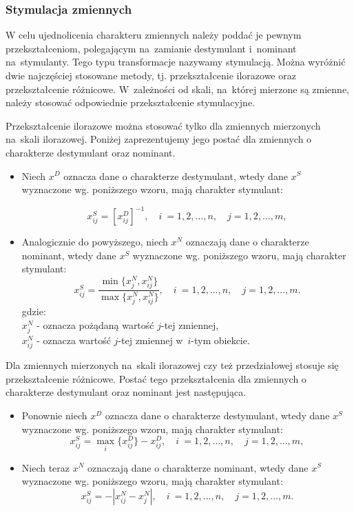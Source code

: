 \documentclass[12pt,a4paper]{report}
\begin{document}
\subsubsection{Stymulacja zmiennych}
W celu ujednolicenia charakteru zmiennych należy poddać je pewnym przekształceniom, polegającym na~zamianie destymulant i~nominant na~stymulanty. Tego typu transformacje nazywamy stymulacją. Można wyróżnić dwie najczęściej stosowane metody, tj. przekształcenie ilorazowe oraz przekształcenie różnicowe. W~zależności od skali, na~której mierzone są zmienne, należy stosować odpowiednie przekształcenie stymulacyjne.

Przekształcenie ilorazowe można stosować tylko dla zmiennych mierzonych na~skali ilorazowej. Poniżej zaprezentujemy jego postać dla zmiennych o charakterze destymulant oraz nominant.
\begin{itemize}
\item Niech $x^{D}$ oznacza dane o charakterze destymulant, wtedy dane $x^{S}$ wyznaczone wg. poniższego wzoru, mają charakter stymulant:

$$
x_{ij}^{S}=[x_{ij}^{D}]^{-1},  \quad i~= 1,2, \ldots, n, \quad j=1,2,\ldots, m,
$$

\item Analogicznie do powyższego, niech $x^{N}$ oznaczają dane o charakterze nominant, wtedy dane $x^{S}$ wyznaczone wg. poniższego wzoru, mają charakter stymulant:
$$
x_{ij}^{S}=\frac{\min\{x_{j}^{N},x_{ij}^{N}\}}{\max\{x_{j}^{N},x_{ij}^{N}\}}, \quad i~= 1,2, \ldots, n, \quad j=1,2,\ldots, m.
$$
gdzie:\\
$x_{j}^{N}$ - oznacza pożądaną wartość $j$-tej zmiennej,\\
$x_{ij}^{N}$ - oznacza wartość $j$-tej zmiennej w~$i$-tym obiekcie.
\end{itemize}

Dla zmiennych mierzonych na~skali ilorazowej czy też przedziałowej stosuje się przekształcenie różnicowe. Postać tego przekształcenia dla zmiennych o charakterze destymulant oraz nominant jest następująca.
\begin{itemize}

\item Ponownie niech $x^{D}$ oznacza dane o charakterze destymulant, wtedy dane $x^{S}$ wyznaczone wg. poniższego wzoru, mają charakter stymulant:
$$
x_{ij}^{S}=\max\limits_{i} \{x_{ij}^{D}\} - x_{ij}^{D}, \quad i~= 1,2, \ldots, n, \quad j=1,2,\ldots, m,
$$
\item Niech teraz $x^{N}$ oznaczają dane o charakterze nominant, wtedy dane $x^{S}$ wyznaczone wg. poniższego wzoru, mają charakter stymulant:
$$
x_{ij}^{S}=-|x_{ij}^{N}-x_{j}^{N}|, \quad i~= 1,2, \ldots, n, \quad j=1,2,\ldots, m.
$$
\end{itemize}
\end{document}
